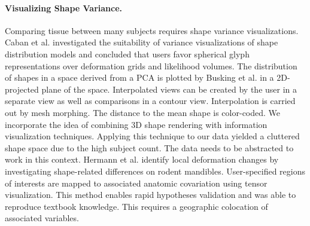\documentclass[journal]{style/vgtc} 			          %
\begin{document}
\paragraph{Visualizing Shape Variance.}
Comparing tissue between many subjects requires shape variance visualizations.
%
Caban et al. \cite{Caban2011} investigated the suitability of variance visualizations of shape distribution models and concluded that users favor spherical glyph representations over deformation grids and likelihood volumes.
%
The distribution of shapes in a space derived from a PCA is plotted by Busking et al. \cite{Busking2010a} in a 2D-projected plane of the space.
%
Interpolated views can be created by the user in a separate view as well as comparisons in a contour view.
%
Interpolation is carried out by mesh morphing.
%
The distance to the mean shape is color-coded.
%
We incorporate the idea of combining 3D shape rendering with information visualization techniques.
%
Applying this technique to our data yielded a cluttered shape space due to the high subject count.
%
The data needs to be abstracted to work in this context.
%
Hermann et al. \cite{Hermann2014} identify local deformation changes by investigating shape-related differences on rodent mandibles.
%
User-specified regions of interests are mapped to associated anatomic covariation using tensor visualization.
%
This method enables rapid hypotheses validation and was able to reproduce textbook knowledge.
%
%
This requires a geographic colocation of associated variables.
%

\end{document}

